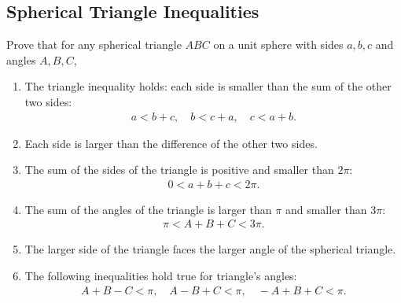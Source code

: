 \documentclass[12pt,a4paper]{memoir}
\theoremstyle{definition}
\begin{document}
\subsection{Spherical Triangle Inequalities}
	\begin{question}
		Prove that for any spherical triangle $ABC$ on a unit sphere with sides $a,b,c$ and angles $A,B,C$,
		\begin{enumerate}
			\item The triangle inequality holds: each side is smaller than the sum of the other two sides: 
			\begin{align*}
				a<b+c, \quad b<c+a, \quad c<a+b.
			\end{align*}
			\item Each side is larger than the difference of the other two sides.
			\item The sum of the sides of the triangle is positive and smaller than $2\pi$:
			\begin{align*}
				0<a+b+c<2\pi.
			\end{align*}
			\item The sum of the angles of the triangle is larger than $\pi$ and smaller than $3\pi$:
			\begin{align*}
				\pi<A+B+C<3\pi.
			\end{align*}
			\item The larger side of the triangle faces the larger angle of the spherical triangle.
			\item The following inequalities hold true for triangle's angles:
			\begin{align*}
				A+B-C<\pi,\quad A-B+C<\pi, \quad -A+B+C<\pi.
			\end{align*}
		\end{enumerate}
	\end{question}
\end{document}
